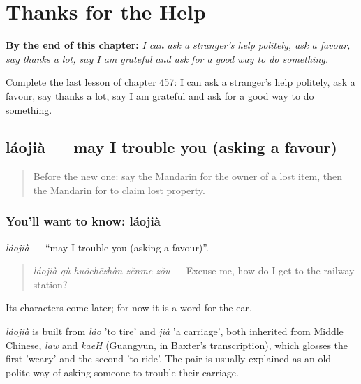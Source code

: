 
\chapter{Thanks for the Help}
\label{ch:zh-thanks-for-the-help}

\begin{chapteropening}
\textbf{By the end of this chapter:} \emph{I can ask a stranger's help politely, ask a favour, say thanks a lot, say I am grateful and ask for a good way to do something.}

Complete the last lesson of chapter 457: I can ask a stranger's help politely, ask a favour, say thanks a lot, say I am grateful and ask for a good way to do something.
\end{chapteropening}

\section[láojià]{láojià — may I trouble you (asking a favour)}

\label{lesson:ZH-C457-laojia}



\begin{quote}
Before the new one: say the Mandarin for the owner of a lost item, then the Mandarin for to claim lost property.
\end{quote}

\subsection*{You'll want to know: láojià}
\emph{láojià} — \textquotedblleft{}may I trouble you (asking a favour)\textquotedblright{}.

\begin{quote}
\emph{láojià qù huǒchēzhàn zěnme zǒu} — Excuse me, how do I get to the railway station?
\end{quote}

Its characters come later; for now it is a word for the ear.

\begin{cousinweb}
\emph{láojià} is built from \emph{láo} 'to tire' and \emph{jià} 'a carriage', both inherited from Middle Chinese, \emph{law} and \emph{kaeH} (Guangyun, in Baxter's transcription), which glosses the first 'weary' and the second 'to ride'. The pair is usually explained as an old polite way of asking someone to trouble their carriage.
\end{cousinweb}

